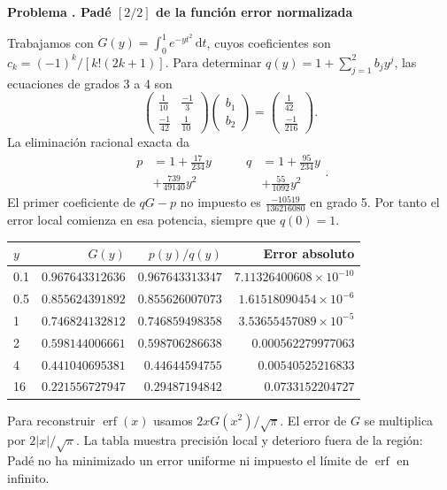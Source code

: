 \documentclass[11pt,a4paper]{article}
\newcommand{\dd}{\,\mathrm d}
\theoremstyle{definition}
\DeclareMathOperator{\erf}{erf}
\newcounter{problema}
\newenvironment{resuelto}[1]{\refstepcounter{problema}\par\medskip\Needspace{6\baselineskip}\textbf{Problema \theproblema. #1}\par}{\par\medskip}
\begin{document}
\begin{resuelto}{Padé $[2/2]$ de la función error normalizada}
Trabajamos con $G(y)=\int_0^1e^{-yt^2}\dd t$, cuyos coeficientes son $c_k=(-1)^k/[k!(2k+1)]$. Para determinar $q(y)=1+\sum_{j=1}^{2}b_jy^j$, las ecuaciones de grados 3 a 4 son
\[
\begin{pmatrix}\frac{1}{10}&\frac{-1}{3}\\\frac{-1}{42}&\frac{1}{10}\end{pmatrix}
\begin{pmatrix}b_{1}\\b_{2}\end{pmatrix}
=\begin{pmatrix}\frac{1}{42}\\\frac{-1}{216}\end{pmatrix}.
\]
La eliminación racional exacta da
\[
\begin{aligned}p&=1+\frac{17}{234}y\\&+\frac{739}{49140}y^{2}\end{aligned}
\qquad \begin{aligned}q&=1+\frac{95}{234}y\\&+\frac{55}{1092}y^{2}\end{aligned}.
\]
El primer coeficiente de $qG-p$ no impuesto es $\frac{-10519}{136216080}$ en grado 5. Por tanto el error local comienza en esa potencia, siempre que $q(0)=1$.

\begin{center}\small\begin{tabular}{lrrr}
\toprule
$y$ & $G(y)$ & $p(y)/q(y)$ & Error absoluto\\\midrule
0.1 & $0.967643312636$ & $0.967643313347$ & $7.11326400608\times10^{-10}$\\
0.5 & $0.855624391892$ & $0.855626007073$ & $1.61518090454\times10^{-6}$\\
1 & $0.746824132812$ & $0.746859498358$ & $3.53655457089\times10^{-5}$\\
2 & $0.598144006661$ & $0.598706286638$ & $0.000562279977063$\\
4 & $0.441040695381$ & $0.44644594755$ & $0.00540525216833$\\
16 & $0.221556727947$ & $0.29487194842$ & $0.0733152204727$\\
\bottomrule\end{tabular}\end{center}

Para reconstruir $\erf(x)$ usamos $2xG(x^2)/\sqrt\pi$. El error de $G$ se multiplica por $2|x|/\sqrt\pi$. La tabla muestra precisión local y deterioro fuera de la región: Padé no ha minimizado un error uniforme ni impuesto el límite de $\erf$ en infinito.
\end{resuelto}
\end{document}
